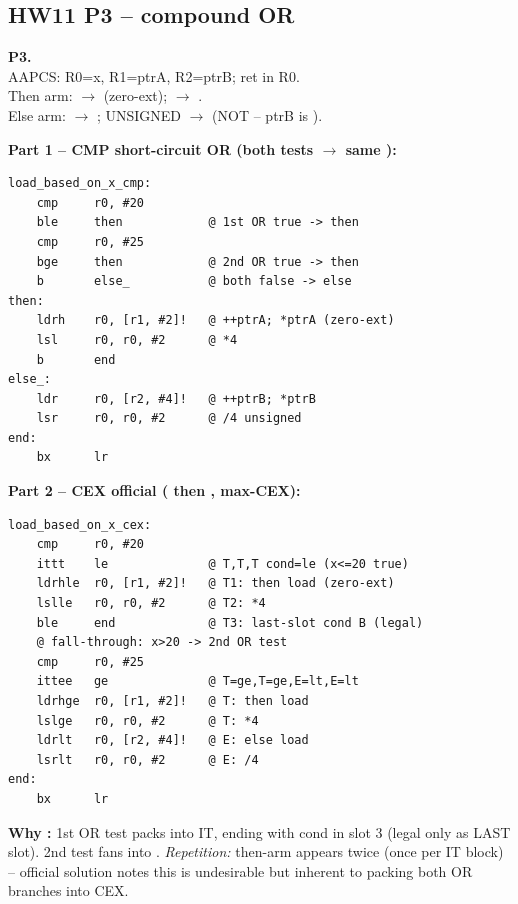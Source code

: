 \subsection{HW11 P3 -- compound OR }
\begin{hwp}\textbf{P3.} \\
AAPCS: R0=x, R1=ptrA, R2=ptrB; ret in R0.\\
Then arm:  $\to$  (zero-ext);  $\to$ .\\
Else arm:  $\to$ ; UNSIGNED  $\to$  (NOT  -- ptrB is ).

\textbf{Part 1 -- CMP short-circuit OR (both tests $\to$ same ):}
\begin{lstlisting}
load_based_on_x_cmp:
    cmp     r0, #20
    ble     then            @ 1st OR true -> then
    cmp     r0, #25
    bge     then            @ 2nd OR true -> then
    b       else_           @ both false -> else
then:
    ldrh    r0, [r1, #2]!   @ ++ptrA; *ptrA (zero-ext)
    lsl     r0, r0, #2      @ *4
    b       end
else_:
    ldr     r0, [r2, #4]!   @ ++ptrB; *ptrB
    lsr     r0, r0, #2      @ /4 unsigned
end:
    bx      lr
\end{lstlisting}

\textbf{Part 2 -- CEX official ( then , max-CEX):}
\begin{lstlisting}
load_based_on_x_cex:
    cmp     r0, #20
    ittt    le              @ T,T,T cond=le (x<=20 true)
    ldrhle  r0, [r1, #2]!   @ T1: then load (zero-ext)
    lslle   r0, r0, #2      @ T2: *4
    ble     end             @ T3: last-slot cond B (legal)
    @ fall-through: x>20 -> 2nd OR test
    cmp     r0, #25
    ittee   ge              @ T=ge,T=ge,E=lt,E=lt
    ldrhge  r0, [r1, #2]!   @ T: then load
    lslge   r0, r0, #2      @ T: *4
    ldrlt   r0, [r2, #4]!   @ E: else load
    lsrlt   r0, r0, #2      @ E: /4
end:
    bx      lr
\end{lstlisting}
\textbf{Why :} 1st OR test packs into IT, ending with cond  in slot 3 (legal only as LAST slot). 2nd test fans into . \emph{Repetition:} then-arm appears twice (once per IT block) -- official solution notes this is undesirable but inherent to packing both OR branches into CEX.


\end{hwp}
